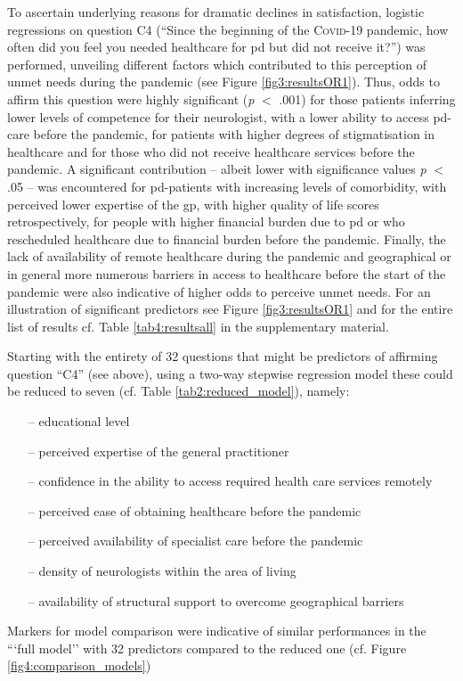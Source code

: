 \documentclass{bmcart}
\begin{document}
To ascertain underlying reasons for dramatic declines in satisfaction, logistic regressions on question C4 (``Since the beginning of the \textsc{Covid}-19 pandemic, how often did you feel you needed healthcare for \acl{pd} but did not receive it?'') was performed, unveiling different factors which contributed to this perception of unmet needs during the pandemic (see Figure \ref{fig3:resultsOR1}). Thus, odds to affirm this question were highly significant (\textit{p} $<$ .001) for those patients inferring lower levels of competence for their neurologist, with a lower ability to access \ac{pd}-care before the pandemic, for patients with higher degrees of stigmatisation in healthcare and for those who did not receive healthcare services before the pandemic. A significant contribution -- albeit lower with significance values \textit{p} $<$ .05 --  was encountered for \ac{pd}-patients with increasing levels of comorbidity, with perceived lower expertise of the \ac{gp}, with higher quality of life scores retrospectively, for people with higher financial burden due to \ac{pd} or who rescheduled healthcare due to financial burden before the pandemic. Finally, the lack of availability of remote healthcare during the pandemic and geographical or in general more numerous barriers in access to healthcare before the start of the pandemic were also indicative of higher odds to perceive unmet needs. For an illustration of significant predictors see Figure \ref{fig3:resultsOR1} and for the entire list of results cf. Table \ref{tab4:resultsall} in the supplementary material. 

Starting with the entirety of 32 questions that might be predictors of affirming question ``C4'' (see above), using a two-way stepwise regression model these could be reduced to seven (cf. Table \ref{tab2:reduced_model}), namely: 
\begin{itemize}
	\item[--] educational level
	\item[--] perceived expertise of the general practitioner
	\item[--] confidence in the ability to access required health care services remotely
	\item[--] perceived ease of obtaining healthcare before the pandemic
	\item[--] perceived availability of specialist care before the pandemic
	\item[--] density of neurologists within the area of living
	\item[--] availability of structural support to overcome geographical barriers
\end{itemize}
Markers for model comparison were indicative of similar performances in the ```full model'' with 32 predictors compared to the reduced one (cf. Figure \ref{fig4:comparison_models})
\end{document}
